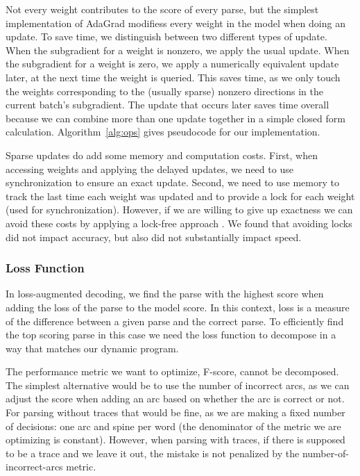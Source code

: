 Not every weight contributes to the score of every parse, but the simplest implementation of AdaGrad modifiess every weight in the model when doing an update.
To save time, we distinguish between two different types of update.
When the subgradient for a weight is nonzero, we apply the usual update.
When the subgradient for a weight is zero, we apply a numerically equivalent update later, at the next time the weight is queried.
This saves time, as we only touch the weights corresponding to the (usually sparse) nonzero directions in the current batch's subgradient.
The update that occurs later saves time overall because we can combine more than one update together in a simple closed form calculation.
Algorithm~\ref{alg:ops} gives pseudocode for our implementation.

Sparse updates do add some memory and computation costs.
First, when accessing weights and applying the delayed updates, we need to use synchronization to ensure an exact update.
Second, we need to use memory to track the last time each weight was updated and to provide a lock for each weight (used for synchronization).
However, if we are willing to give up exactness we can avoid these costs by applying a lock-free approach \parencite{hogwild}.
We found that avoiding locks did not impact accuracy, but also did not substantially impact speed.


\subsubsection{Loss Function}

In loss-augmented decoding, we find the parse with the highest score when adding the loss of the parse to the model score.
In this context, loss is a measure of the difference between a given parse and the correct parse.
To efficiently find the top scoring parse in this case we need the loss function to decompose in a way that matches our dynamic program.

The performance metric we want to optimize, F-score, cannot be decomposed.
The simplest alternative would be to use the number of incorrect arcs, as we can adjust the score when adding an arc based on whether the arc is correct or not.
For parsing without traces that would be fine, as we are making a fixed number of decisions: one arc and spine per word (\myie the denominator of the metric we are optimizing is constant).
However, when parsing with traces, if there is supposed to be a trace and we leave it out, the mistake is not penalized by the number-of-incorrect-arcs metric.

